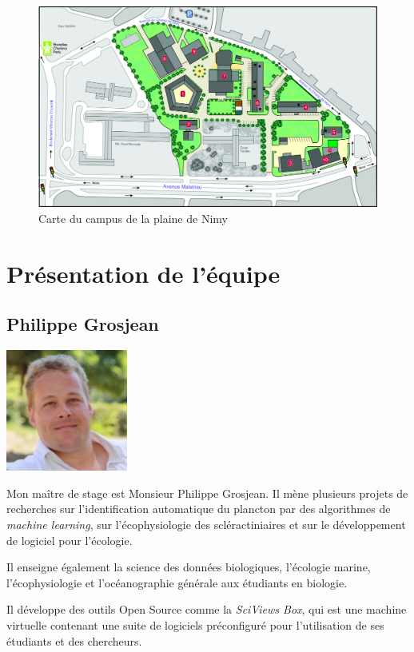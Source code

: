 \documentclass[]{report}
\begin{document}
\begin{figure}
\centering
\includegraphics{../image/plaine-Nimy.jpg}
\caption{Carte du campus de la plaine de Nimy}
\end{figure}

\section{Présentation de l'équipe}\label{presentation-de-lequipe}

\subsection{Philippe Grosjean}\label{philippe-grosjean}

\includegraphics[width=4.00000cm]{../image/Grosjean2.jpg}

Mon maître de stage est Monsieur Philippe Grosjean. Il mène plusieurs
projets de recherches sur l'identification automatique du plancton par
des algorithmes de \emph{machine learning}, sur l'écophysiologie des
scléractiniaires et sur le développement de logiciel pour l'écologie.

Il enseigne également la science des données biologiques, l'écologie
marine, l'écophysiologie et l'océanographie générale aux étudiants en
biologie.

Il développe des outils Open Source comme la \emph{SciViews Box}, qui
est une machine virtuelle contenant une suite de logiciels préconfiguré
pour l'utilisation de ses étudiants et des chercheurs.
\end{document}
